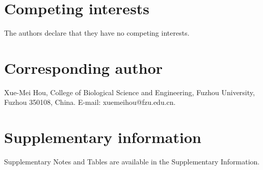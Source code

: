 \documentclass[11pt]{article}
\begin{document}
\section*{Competing interests}

The authors declare that they have no competing interests.

\section*{Corresponding author}

Xue-Mei Hou, College of Biological Science and Engineering, Fuzhou University, Fuzhou 350108, China. E-mail: xuemeihou@fzu.edu.cn.

\section*{Supplementary information}

Supplementary Notes and Tables are available in the Supplementary Information.
\end{document}
